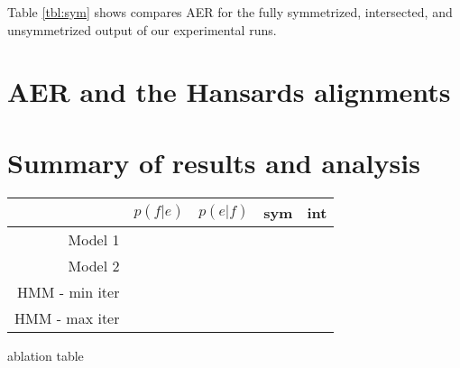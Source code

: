 \documentclass{article}
\begin{document}
Table \ref{tbl:sym} shows compares AER for the fully symmetrized, intersected, and unsymmetrized output of our experimental runs.

\section{AER and the Hansards alignments}
\label{aer}

\section{Summary of results and analysis}

\begin{table}
\begin{center}
\begin{tabular}{r|cccc}
    & $p(f|e)$ & $p(e|f)$ & sym & int\\ \hline
    Model 1 & & & & \\
    Model 2 & & & & \\
    HMM - min iter & & & & \\
    HMM - max iter & & & & \\

\end{tabular}
\end{center}
\end{table}


ablation table
\end{document}
